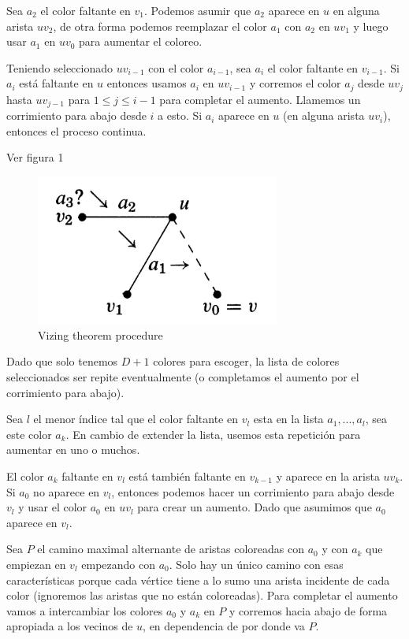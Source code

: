 \documentclass[a4paper]{article}
\begin{document}
 Sea $a_2$ el color faltante en $v_1$. Podemos asumir que $a_2$ aparece en $u$ en alguna arista $uv_2$, de otra forma podemos reemplazar el color $a_1$ con $a_2$ en $uv_1$ y luego usar $a_1$ en $uv_0$ para aumentar el coloreo. 
 
 Teniendo seleccionado $uv_{i-1}$ con el color $a_{i-1}$, sea $a_i$ el color faltante en $v_{i-1}$. Si $a_i$ est\'a faltante en $u$ entonces usamos $a_i$ en $uv_{i-1}$ y corremos el color $a_j$ desde $uv_j$ hasta $uv_{j-1}$ para $1 \leq j \leq i-1$ para completar el aumento. Llamemos un corrimiento para abajo desde $i$ a esto. Si $a_i$ aparece en $u$ (en alguna arista $uv_i$), entonces el proceso continua.

 Ver figura 1
 
\begin{figure}
    \begin{center}
        \includegraphics[width=8cm]{image1.png}
        \caption{Vizing theorem procedure} 
    \end{center}
\end{figure}

Dado que solo tenemos $D + 1$ colores para escoger, la lista de colores seleccionados ser repite eventualmente (o completamos el aumento por el corrimiento para abajo).

Sea $l$ el menor \'indice tal que el color faltante en $v_l$ esta en la lista $a_1, ..., a_l$, sea este color $a_k$. En cambio de extender la lista, usemos esta repetici\'on para aumentar en uno o muchos.

El color $a_k$ faltante en $v_l$ est\'a tambi\'en faltante en $v_{k-1}$ y aparece en la arista $uv_k$. Si $a_0$ no aparece en $v_l$, entonces podemos hacer un corrimiento para abajo desde $v_l$ y usar el color $a_0$ en $uv_l$ para crear un aumento. Dado que asumimos que $a_0$ aparece en $v_l$.

Sea $P$ el camino maximal alternante de aristas coloreadas con $a_0$ y con $a_k$ que empiezan en $v_l$ empezando con $a_0$. Solo hay un \'unico camino con esas caracter\'isticas porque cada v\'ertice tiene a lo sumo una arista incidente de cada color (ignoremos las aristas que no est\'an coloreadas). Para completar el aumento vamos a intercambiar los colores $a_0$ y $a_k$ en $P$ y corremos hacia abajo de forma apropiada a los vecinos de $u$, en dependencia de por donde va $P$.
\end{document}
